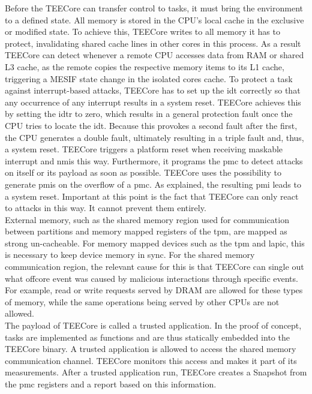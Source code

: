 Before the TEECore can transfer control to tasks, it must bring the environment
to a defined state. All memory is stored in the CPU's local cache in the
exclusive or modified state. To achieve this, TEECore writes to all memory it
has to protect, invalidating shared cache lines in other cores in this process.
As a result TEECore can detect whenever a remote CPU accesses data from RAM or
shared L3 cache, as the remote copies the respective memory items to its L1
cache, triggering a MESIF state change in the isolated cores cache. To protect a
task against interrupt-based attacks, TEECore has to set up the \gls{idt}
correctly so that any occurrence of any interrupt results in a system reset.
TEECore achieves this by setting the \gls{idtr} to zero, which results in a
general protection fault once the CPU tries to locate the \gls{idt}. Because
this provokes a second fault after the first, the CPU generates a double fault,
ultimately resulting in a triple fault and, thus, a system reset. TEECore
triggers a platform reset when receiving maskable interrupt and \glspl{nmi} this
way. Furthermore, it programs the \gls{pmc} to detect attacks on itself or its
payload as soon as possible. TEECore uses the possibility to generate
\glspl{pmi} on the overflow of a \gls{pmc}. As explained, the resulting
\gls{pmi} leads to a system reset. Important at this point is the fact that
TEECore can only react to attacks in this way. It cannot prevent them
entirely.\\

External memory, such as the shared memory region used for communication between
partitions and memory mapped registers of the \gls{tpm}, are mapped as strong
un-cacheable. For memory mapped devices such as the \gls{tpm} and \gls{lapic},
this is necessary to keep device memory in sync. For the shared memory
communication region, the relevant cause for this is that TEECore can
single out what offcore event was caused by malicious interactions through
specific events. For example, read or write requests served by DRAM are allowed
for these types of memory, while the same operations being served by other CPUs
are not allowed.\\

The payload of TEECore is called a trusted application. In the proof of concept,
tasks are implemented as functions and are thus statically embedded into the
TEECore binary. A trusted application is allowed to access the shared memory
communication channel. TEECore monitors this access and makes it part of its
measurements. After a trusted application run, TEECore creates a Snapshot from
the \gls{pmc} registers and a report based on this information.

